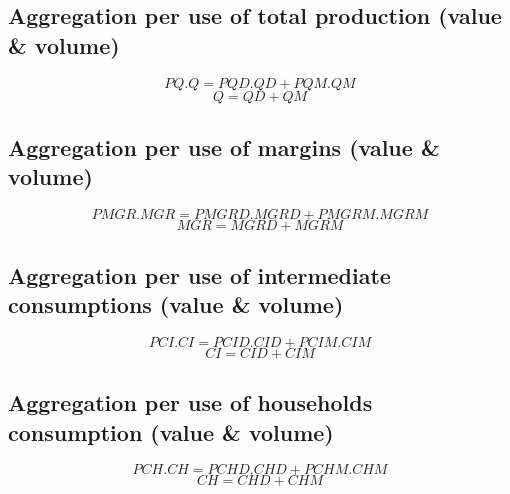 \documentclass[12pt]{article}
\numberwithin{equation}{section}
\begin{document}
\subsection{Aggregation per use of total production 					(value \& volume)}



\begin{dmath}
PQ . Q = PQD . QD + PQM . QM
\end{dmath}
\begin{dmath}
Q = QD + QM
\end{dmath}



\subsection{Aggregation per use of margins 								(value \& volume)}



\begin{dmath}
PMGR . MGR = PMGRD . MGRD + PMGRM . MGRM
\end{dmath}
\begin{dmath}
MGR = MGRD + MGRM
\end{dmath}



\subsection{Aggregation per use of intermediate consumptions 			(value \& volume)}



\begin{dmath}
PCI . CI = PCID . CID + PCIM . CIM
\end{dmath}
\begin{dmath}
CI = CID + CIM
\end{dmath}



\subsection{Aggregation per use of households consumption 				(value \& volume)}



\begin{dmath}
PCH . CH = PCHD . CHD + PCHM . CHM
\end{dmath}
\begin{dmath}
CH = CHD + CHM
\end{dmath}
\end{document}
